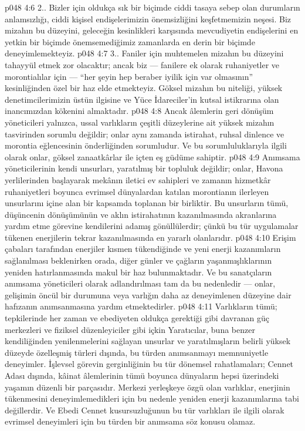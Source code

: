 \vs p048 4:6 2.\bibnobreakspace {}. Bizler için oldukça sık bir biçimde ciddi tasaya sebep olan durumların anlamsızlığı, ciddi kişisel endişelerimizin önemsizliğini keşfetmemizin neşesi. Biz mizahın bu düzeyini, geleceğin kesinlikleri karşısında mevcudiyetin endişelerini en yetkin bir biçimde önemsemediğimiz zamanlarda en derin bir biçimde deneyimlemekteyiz.
\vs p048 4:7 3.. Faniler için muhtemelen mizahın bu düzeyini tahayyül etmek zor olacaktır; ancak biz --- fanilere ek olarak ruhaniyetler ve morontialılar için --- “her şeyin hep beraber iyilik için var olmasının” kesinliğinden özel bir haz elde etmekteyiz. Göksel mizahın bu niteliği, yüksek denetimcilerimizin üstün ilgisine ve Yüce İdareciler’in kutsal istikrarına olan inancımızdan kökenini almaktadır.
\vs p048 4:8 Ancak âlemlerin geri dönüşüm yöneticileri yalnızca, ussal varlıkların çeşitli düzeylerine ait yüksek mizahın tasvirinden sorumlu değildir; onlar aynı zamanda istirahat, ruhsal dinlence ve morontia eğlencesinin önderliğinden sorumludur. Ve bu sorumluluklarıyla ilgili olarak onlar, göksel zanaatkârlar ile içten eş güdüme sahiptir.
\vs p048 4:9 Anımsama yöneticilerinin kendi unsurları, yaratılmış bir topluluk değildir; onlar, Havona yerlilerinden başlayarak mekânın iletici ev sahipleri ve zamanın hizmetkâr ruhaniyetleri boyunca evrimsel dünyalardan katılan morontianın ilerleyen unsurlarını içine alan bir kapsamda toplanan bir birliktir. Bu unsurların tümü, düşüncenin dönüşümünün ve aklın istirahatının kazanılmasında akranlarına yardım etme görevine kendilerini adamış gönüllülerdir; çünkü bu tür uygulamalar tükenen enerjilerin tekrar kazanılmasında en yararlı olanlarıdır.
\vs p048 4:10 Erişim çabaları tarafından enerjiler kısmen tükendiğinde ve yeni enerji kazanımların sağlanılması beklenirken orada, diğer günler ve çağların yaşanmışlıklarının yeniden hatırlanmasında makul bir haz bulunmaktadır.  Ve bu sanatçıların anımsama yöneticileri olarak adlandırılması tam da bu nedenledir --- onlar, gelişimin öncül bir durumuna veya varlığın daha az deneyimlenen düzeyine dair hafızanın anımsanmasına yardım etmektedirler.
\vs p048 4:11 Varlıkların tümü; tepkilerinde her zaman ve ebediyeten oldukça gerektiği gibi davranan güç merkezleri ve fiziksel düzenleyiciler gibi içkin Yaratıcılar, buna benzer kendiliğinden yenilenmelerini sağlayan unsurlar ve yaratılmışların belirli yüksek düzeyde özelleşmiş türleri dışında, bu türden anımsanmayı memnuniyetle deneyimler. İşlevsel görevin gerginliğinin bu tür dönemsel rahatlamaları; Cennet Adası dışında, kâinat âlemlerinin tümü boyunca dünyaların hepsi üzerindeki yaşamın düzenli bir parçasıdır. Merkezi yerleşkeye özgü olan varlıklar, enerjinin tükenmesini deneyimlemedikleri için bu nedenle yeniden enerji kazanımlarına tabi değillerdir. Ve Ebedi Cennet kusursuzluğunun bu tür varlıkları ile ilgili olarak evrimsel deneyimleri için bu türden bir anımsama söz konusu olamaz.
